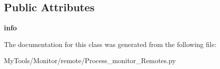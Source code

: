 \subsection*{Public Attributes}
\begin{DoxyCompactItemize}
\item 
\mbox{\label{classMIS_1_1MyTools_1_1Monitor_1_1remote_1_1Process__monitor__Remotes_1_1__info__struct_af195225c89ec86ed79893a57d971e983}} 
{\bfseries info}
\end{DoxyCompactItemize}


The documentation for this class was generated from the following file\+:\begin{DoxyCompactItemize}
\item 
My\+Tools/\+Monitor/remote/Process\+\_\+monitor\+\_\+\+Remotes.\+py\end{DoxyCompactItemize}
